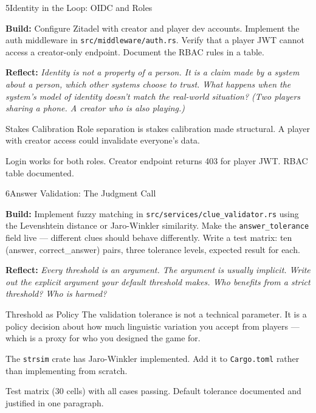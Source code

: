 \documentclass[
  11pt,
  oneside,
  DIV=12,
]{scrartcl}
\newcommand{\build}[1]{\textbf{\color{SpringMoss}Build:} #1}
\newcommand{\reflect}[1]{\textbf{\color{ConceptBlue}Reflect:} \textit{#1}}
\begin{document}
\begin{milestone}{5}{Identity in the Loop: OIDC and Roles}

\build{Configure Zitadel with creator and player dev accounts. Implement the auth middleware in
\texttt{src/middleware/auth.rs}. Verify that a player JWT cannot access a
creator-only endpoint. Document the RBAC rules in a table.}

\medskip
\reflect{Identity is not a property of a person. It is a claim made by a
system about a person, which other systems choose to trust. What happens
when the system's model of identity doesn't match the real-world situation?
(Two players sharing a phone. A creator who is also playing.)}

\begin{hitlconcept}{Stakes Calibration}
  Role separation is stakes calibration made structural. A player with
  creator access could invalidate everyone's data.
\end{hitlconcept}

\begin{checkpoint}
  Login works for both roles. Creator endpoint returns 403 for player JWT.
  RBAC table documented.
\end{checkpoint}

\end{milestone}

\begin{milestone}{6}{Answer Validation: The Judgment Call}

\build{Implement fuzzy matching in \texttt{src/services/clue\_validator.rs}
using the Levenshtein distance or Jaro-Winkler similarity. Make the
\texttt{answer\_tolerance} field live — different clues should behave
differently. Write a test matrix: ten (answer, correct\_answer) pairs,
three tolerance levels, expected result for each.}

\medskip
\reflect{Every threshold is an argument. The argument is usually implicit.
Write out the explicit argument your default threshold makes. Who benefits
from a strict threshold? Who is harmed?}

\begin{hitlconcept}{Threshold as Policy}
  The validation tolerance is not a technical parameter. It is a policy
  decision about how much linguistic variation you accept from players —
  which is a proxy for who you designed the game for.
\end{hitlconcept}

\begin{hintbox}
  The \texttt{strsim} crate has Jaro-Winkler implemented. Add it to
  \texttt{Cargo.toml} rather than implementing from scratch.
\end{hintbox}

\begin{checkpoint}
  Test matrix (30 cells) with all cases passing. Default tolerance
  documented and justified in one paragraph.
\end{checkpoint}

\end{milestone}
\end{document}
